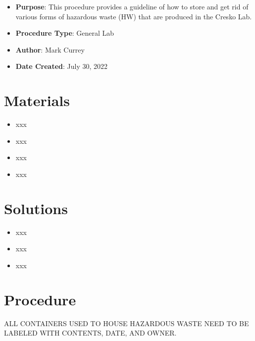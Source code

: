 \documentclass[
  letterpaper,
  DIV=11,
  numbers=noendperiod]{scrreprt}
\providecommand{\tightlist}{%
  \setlength{\itemsep}{0pt}\setlength{\parskip}{0pt}}\usepackage{longtable,booktabs,array}
\begin{document}
\begin{itemize}
\tightlist
\item
  \textbf{Purpose}: This procedure provides a guideline of how to store
  and get rid of various forms of hazardous waste (HW) that are produced
  in the Cresko Lab.
\item
  \textbf{Procedure Type}: General Lab
\item
  \textbf{Author}: Mark Currey
\item
  \textbf{Date Created}: July 30, 2022
\end{itemize}

\hypertarget{materials-3}{%
\section{Materials}\label{materials-3}}

\begin{itemize}
\tightlist
\item
  xxx
\item
  xxx
\item
  xxx
\item
  xxx
\end{itemize}

\hypertarget{solutions-3}{%
\section{Solutions}\label{solutions-3}}

\begin{itemize}
\tightlist
\item
  xxx
\item
  xxx
\item
  xxx
\end{itemize}

\hypertarget{procedure-3}{%
\section{Procedure}\label{procedure-3}}

\begin{tcolorbox}[enhanced jigsaw, toprule=.15mm, breakable, coltitle=black, leftrule=.75mm, title=\textcolor{quarto-callout-important-color}{\faExclamation}\hspace{0.5em}{IMPORTANT}, bottomrule=.15mm, toptitle=1mm, bottomtitle=1mm, colframe=quarto-callout-important-color-frame, opacityback=0, colback=white, opacitybacktitle=0.6, colbacktitle=quarto-callout-important-color!10!white, rightrule=.15mm, titlerule=0mm, arc=.35mm, left=2mm]

ALL CONTAINERS USED TO HOUSE HAZARDOUS WASTE NEED TO BE LABELED WITH
CONTENTS, DATE, AND OWNER.

\end{tcolorbox}
\end{document}
